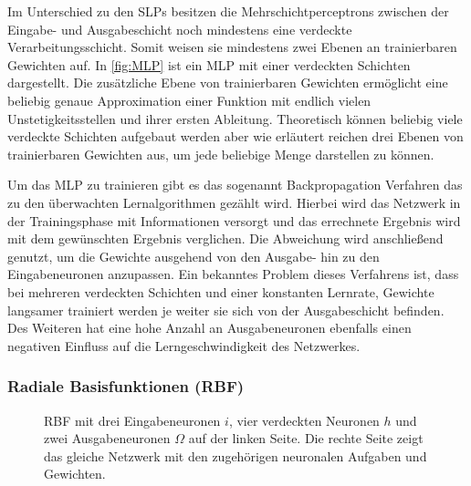 Im Unterschied zu den SLPs besitzen die Mehrschichtperceptrons zwischen der Eingabe- und Ausgabeschicht noch mindestens eine verdeckte Verarbeitungsschicht. Somit weisen sie mindestens zwei Ebenen an trainierbaren Gewichten auf. In \autoref{fig:MLP} ist ein MLP mit einer verdeckten Schichten dargestellt. Die zusätzliche Ebene von trainierbaren Gewichten ermöglicht eine beliebig genaue Approximation einer Funktion mit endlich vielen Unstetigkeitsstellen und ihrer ersten Ableitung. Theoretisch können beliebig viele verdeckte Schichten aufgebaut werden aber wie \hbox{\citet{dkriesel07}} erläutert reichen drei Ebenen von trainierbaren Gewichten aus, um jede beliebige Menge darstellen zu können.

Um das MLP zu trainieren gibt es das sogenannt Backpropagation Verfahren das zu den überwachten Lernalgorithmen gezählt wird. Hierbei wird das Netzwerk in der Trainingsphase mit Informationen versorgt und das errechnete Ergebnis wird mit dem gewünschten Ergebnis verglichen. Die Abweichung wird anschließend genutzt, um die Gewichte ausgehend von den Ausgabe- hin zu den Eingabeneuronen anzupassen. Ein bekanntes Problem dieses Verfahrens ist, dass bei mehreren verdeckten Schichten und einer konstanten Lernrate, Gewichte langsamer trainiert werden je weiter sie sich von der Ausgabeschicht befinden. Des Weiteren hat eine hohe Anzahl an Ausgabeneuronen ebenfalls einen negativen Einfluss auf die Lerngeschwindigkeit des Netzwerkes.


\subsubsection{Radiale Basisfunktionen (RBF)}
\begin{figure}[!htb]
    \centering
        
    \caption{RBF mit drei Eingabeneuronen $i$, vier verdeckten Neuronen $h$  und zwei Ausgabeneuronen $\Omega$ auf der linken Seite. Die rechte Seite zeigt das gleiche Netzwerk mit den zugehörigen neuronalen Aufgaben und Gewichten.}
    \label{fig:RBF}
\end{figure}

